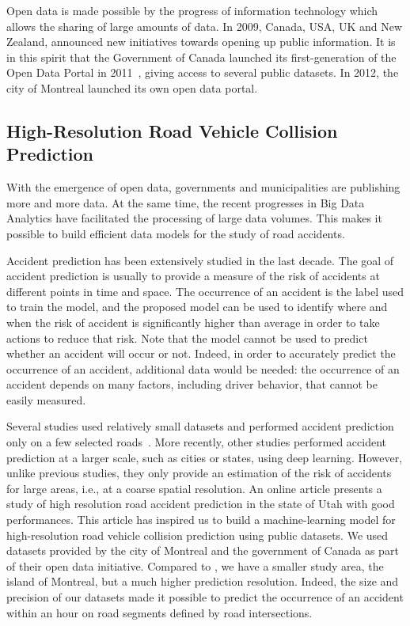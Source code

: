 \documentclass[conference]{IEEEtran}
\begin{document}
Open data is made possible by the progress of information technology which allows the sharing of large amounts of data. In 2009, Canada, USA, UK and New Zealand, announced new initiatives towards opening up public information. It is in this spirit that the Government of Canada launched its first-generation of the Open Data Portal in 2011~\cite{opendata101}, giving access to several public datasets. In 2012, the city of Montreal launched its own open data portal.


\subsection{High-Resolution Road Vehicle Collision Prediction}

With the emergence of open data, governments and municipalities are publishing more and more data. At the same time, the recent progresses in Big Data Analytics have facilitated the processing of large data volumes. This makes it possible to build efficient data models for the study of road accidents.

Accident prediction has been extensively studied in the last decade. 
The goal of accident prediction is usually to provide a measure of the risk of accidents at different points in time and space. 
The occurrence of an accident is the label used to train the model, and the proposed model can be used to identify where and when the risk of accident is significantly higher than average in order to take actions to reduce that risk. 
Note that the model cannot be used to predict whether an accident will occur or not. 
Indeed, in order to accurately predict the occurrence of an accident, additional data would be needed: the occurrence of an accident depends on many factors, including driver behavior, that cannot be easily measured. 

Several studies used relatively small datasets and performed accident prediction only on a few selected roads~\cite{Chang2005, Chang2005b, Lin2015, Theofilatos2017}. More recently, other studies performed accident prediction at a larger scale, such as cities or states, using deep
learning\cite{QChen2016, Najjar2017, Yuan2018}.
However, unlike previous studies, they only provide an estimation of the risk of accidents for large areas, i.e., at a coarse spatial resolution. An online article\cite{mediumarticle} presents a study of high resolution road accident prediction in the state of Utah with good performances. This article has inspired us to build a machine-learning model for high-resolution road vehicle collision prediction using public datasets. We used datasets provided by the city of Montreal and the government of Canada as part of their open data initiative. Compared to \cite{mediumarticle}, we have a smaller study area, the island of Montreal, but a much higher prediction resolution. Indeed, the size and precision of our datasets made it possible to predict the occurrence of an accident within an hour on road segments defined by road intersections.
\end{document}
